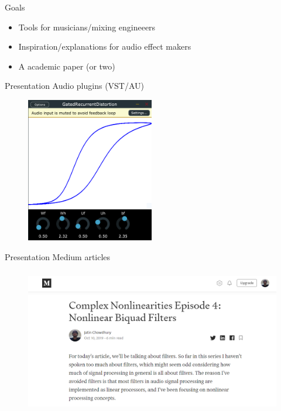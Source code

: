 \begin{frame}
\end{frame}

\begin{frame}{Goals}
    \begin{itemize}
        \item Tools for musicians/mixing engineeers
        \item Inspiration/explanations for audio effect makers
        \item A academic paper (or two)
    \end{itemize}
\end{frame}

\begin{frame}{Presentation}
    Audio plugins (VST/AU)
    \vspace{1ex}
    \begin{figure}
        \centering
        \includegraphics[height=2.5in]{Figures/GRU_screenshot}
    \end{figure}
\end{frame}

\begin{frame}{Presentation}
    Medium articles
    \vspace{1ex}
    \begin{figure}
        \centering
        \includegraphics[height=2.5in]{Figures/medium}
    \end{figure}
\end{frame}

\begin{frame}{}
\end{frame}


